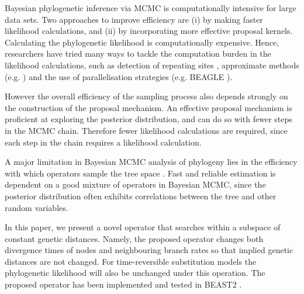 \documentclass{bmcart}
\begin{document}
Bayesian phylogenetic inference via MCMC is computationally intensive for large data sets.
Two approaches to improve efficiency are (i) by making faster likelihood calculations, and (ii) by incorporating more effective proposal kernels. Calculating the phylogenetic likelihood is computationally expensive.
Hence, researchers have tried many ways to tackle the computation burden in the likelihood calculations, such as detection of repeating sites \cite{kobert2017efficient},  approximate methods (e.g. \cite{reis2011approximate}) and the use of parallelisation strategies (e.g. BEAGLE \cite{ayres2011beagle}).

However the overall efficiency of the sampling process also depends strongly on the construction of the proposal mechanism. An effective proposal mechanism is proficient at exploring the posterior distribution, and can do so with fewer steps in the MCMC chain. Therefore fewer likelihood calculations are required, since each step in the chain requires a likelihood calculation.

A major limitation in Bayesian MCMC analysis of phylogeny lies in the efficiency with which operators sample the tree space \cite{lakner2008efficiency,hohna2012guided}. Fast and reliable estimation is dependent on a good mixture of operators in Bayesian MCMC, since the posterior distribution often exhibits correlations between the tree and other random variables.

In this paper, we present a novel operator that searches within a subspace of constant genetic distances.
Namely, the proposed operator changes both divergence times of nodes and neighbouring branch rates so that implied genetic distances are not changed. For time-reversible substitution models the phylogenetic likelihood will also be unchanged under this operation. The proposed operator has been implemented and tested in BEAST2 \cite{bouckaert2014beast}.
\end{document}
